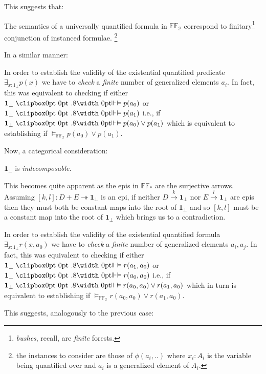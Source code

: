 		 This suggests that:
		 \begin{lem}
		 	The semantics of a universally quantified formula in $\mathbb{FF_2}$ correspond to  finitary\footnote{\emph{bushes}, recall, are \emph{finite} forests.} conjunction of instanced formulae.
		 	\footnote{the instances to consider are those of $\phi(a_i,..)$ where $x_i : A_i$ is the variable being quantified over and $a_i$ is a generalized element of $A_i$.} 
		 \end{lem}
		 
In a similar manner:

\begin{remark}
	In order to establish the validity of the existential quantified predicate $\exists_{x:1_\bot} p(x)$ we have to \emph{check} a \emph{finite} number of generalized elements $a_i$. 
	In fact, this was equivalent to checking if either $\textbf{1}_\bot \VDashA p(a_0)$ or $\textbf{1}_\bot \VDashA p(a_1)$  i.e., if $\textbf{1}_\bot \VDashA p(a_0) \lor p(a_1) $ which is equivalent to establishing if $\models_{\mathbb{FF_2}} p(a_0) \lor p(a_1) $.
\end{remark}

Now, a categorical consideration:

\begin{lem}
	$\textbf{1}_\bot$ is \emph{indecomposable}.
\end{lem} 
	This becomes quite apparent as the epis in $\mathbb{FF}_*$ are the surjective arrows. Assuming $[k,l] : D + E \twoheadrightarrow \textbf{1}_\bot$ is an epi, if neither $D \xrightarrow{k} \textbf{1}_\bot$ nor $E \xrightarrow{l} \textbf{1}_\bot$ are epis then they must both be constant maps into the root of $\textbf{1}_\bot$ and so $[k,l]$ must be a constant map into the root of $\textbf{1}_\bot$ which brings us to a contradiction.

\begin{remark}
	In order to establish the validity of the existential quantified formula $\exists_{x:1_\bot} r(x,a_0)$ we have to \emph{check} a \emph{finite} number of generalized elements $a_i,a_j$. \newline
	In fact, this was equivalent to checking if either $\textbf{1}_\bot \VDashA r(a_1,a_0)$ or $\textbf{1}_\bot \VDashA r(a_0,a_0)$  i.e., if $\textbf{1}_\bot \VDashA r(a_0,a_0) \lor r(a_1,a_0) $ which in turn is equivalent to establishing if $\models_{\mathbb{FF_2}} r(a_0,a_0) \lor r(a_1,a_0) $.
\end{remark} 

This suggests, analogously to the previous case:

